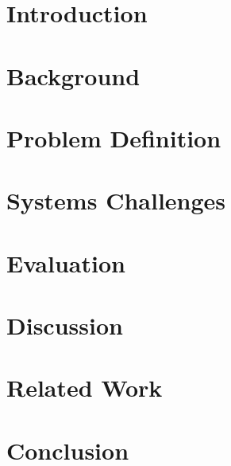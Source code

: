

\abstract{{\it }}

\chapter{Introduction}
\label{sec:intro}


\chapter{Background}
\label{sec:overview}


\chapter{Problem Definition}
\label{sec:formalism}


\chapter{\SIMULATOR}
\label{sec:approach}


\chapter{Systems Challenges}
\label{sec:architecture}
\label{sec:systems_challenges}


\chapter{Evaluation}
\label{sec:evaluation}


\chapter{Discussion}
\label{sec:discussion}


\chapter{Related Work}
\label{sec:related_work}


\chapter{Conclusion}
\label{sec:conclusion}



\renewcommand{\baselinestretch}{1.0}


%

